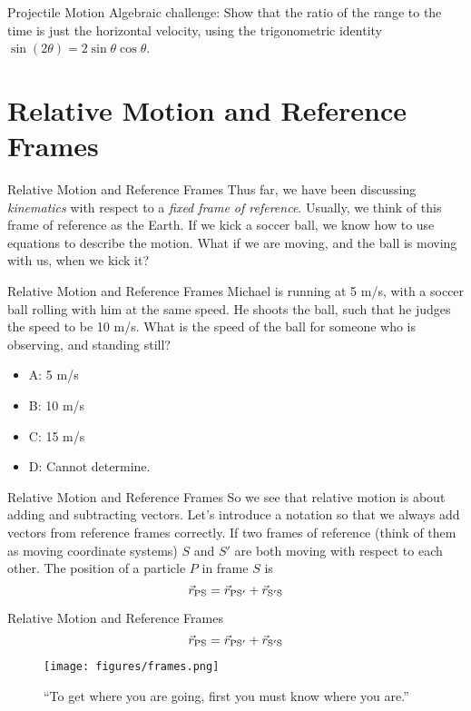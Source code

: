 \documentclass{beamer}
\begin{document}
\begin{frame}{Projectile Motion}
\alert{Algebraic challenge}: Show that the ratio of the range to the time is just the horizontal velocity, using the trigonometric identity $\sin(2\theta) = 2\sin\theta\cos\theta$.
\end{frame}

\section{Relative Motion and Reference Frames}

\begin{frame}{Relative Motion and Reference Frames}
Thus far, we have been discussing \textit{kinematics} with respect to a \textit{fixed frame of reference}.  Usually, we think of this frame of reference as the Earth.  If we kick a soccer ball, we know how to use equations to describe the motion.  What if we are moving, and the ball is moving with us, when we kick it?
\end{frame}

\begin{frame}{Relative Motion and Reference Frames}
Michael is running at 5 m/s, with a soccer ball rolling with him at the same speed.  He shoots the ball, such that he judges the speed to be 10 m/s.  What is the speed of the ball for someone who is observing, and standing still?
\begin{itemize}
\item A: 5 m/s
\item B: 10 m/s
\item C: 15 m/s
\item D: Cannot determine.
\end{itemize}
\end{frame}

\begin{frame}{Relative Motion and Reference Frames}
So we see that relative motion is about adding and subtracting vectors.  Let's introduce a notation so that we always add vectors from reference frames correctly.  If two frames of reference (think of them as moving coordinate systems) $S$ and $S'$ are both moving with respect to each other.  The position of a particle $P$ in frame $S$ is \\
\begin{equation}
\vec{r}_{\rm PS} = \vec{r}_{\rm PS'} + \vec{r}_{\rm S'S}
\end{equation}
\end{frame}

\begin{frame}{Relative Motion and Reference Frames}
\small
\begin{equation}
\vec{r}_{\rm PS} = \vec{r}_{\rm PS'} + \vec{r}_{\rm S'S}
\end{equation}
\begin{figure}
\centering
\texttt{[image: figures/frames.png]}
\caption{\label{fig:frame} \small ``To get where you are going, first you must know where you are.''}
\end{figure}
\end{frame}
\end{document}
